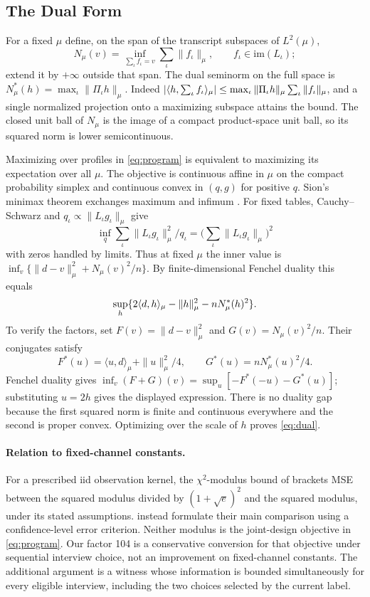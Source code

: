 \subsection{The Dual Form}
For a fixed $\mu$ define, on the span of the transcript subspaces of $L^2(\mu)$,
\[
 N_\mu(v)=\inf_{\sum_\iota f_\iota=v}\sum_\iota\|f_\iota\|_\mu,\qquad f_\iota\in\mathrm{im}(L_\iota);
\]
extend it by $+\infty$ outside that span. The dual seminorm on the full space is $N_\mu^*(h)=\max_\iota\|\Pi_\iota h\|_\mu$. Indeed $|\langle h,\sum_\iota f_\iota\rangle_\mu|\le\max_\iota\|\Pi_\iota h\|_\mu\sum_\iota\|f_\iota\|_\mu$, and a single normalized projection onto a maximizing subspace attains the bound. The closed unit ball of $N_\mu$ is the image of a compact product-space unit ball, so its squared norm is lower semicontinuous.

Maximizing over profiles in \eqref{eq:program} is equivalent to maximizing its expectation over all $\mu$. The objective is continuous affine in $\mu$ on the compact probability simplex and continuous convex in $(q,g)$ for positive $q$. Sion's minimax theorem exchanges maximum and infimum \citep{sion1958}. For fixed tables, Cauchy--Schwarz and $q_\iota\propto\|L_\iota g_\iota\|_\mu$ give
\[
 \inf_q \sum_\iota\|L_\iota g_\iota\|_\mu^2/q_\iota
      =\Big(\sum_\iota\|L_\iota g_\iota\|_\mu\Big)^2
\]
with zeros handled by limits. Thus at fixed $\mu$ the inner value is $\inf_v \{\|d-v\|_\mu^2+N_\mu(v)^2/n\}$. By finite-dimensional Fenchel duality this equals
\[
 \sup_h\{2\langle d,h\rangle_\mu-\|h\|_\mu^2-nN_\mu^*(h)^2\}.
\]
To verify the factors, set $F(v)=\|d-v\|_\mu^2$ and $G(v)=N_\mu(v)^2/n$. Their conjugates satisfy
\[
 F^*(u)=\langle u,d\rangle_\mu+\|u\|_\mu^2/4,
 \qquad G^*(u)=nN_\mu^*(u)^2/4.
\]
Fenchel duality gives $\inf_v(F+G)(v)=\sup_u[-F^*(-u)-G^*(u)]$; substituting $u=2h$ gives the displayed expression. There is no duality gap because the first squared norm is finite and continuous everywhere and the second is proper convex. Optimizing over the scale of $h$ proves \eqref{eq:dual}.

\paragraph{Relation to fixed-channel constants.}
For a prescribed iid observation kernel, the $\chi^2$-modulus bound of \citet{polyanskiy2026} brackets MSE between the squared modulus divided by $(1+\sqrt e)^2$ and the squared modulus, under its stated assumptions. \citet{juditsky2009} instead formulate their main comparison using a confidence-level error criterion. Neither modulus is the joint-design objective in \eqref{eq:program}. Our factor 104 is a conservative conversion for that objective under sequential interview choice, not an improvement on fixed-channel constants. The additional argument is a witness whose information is bounded simultaneously for every eligible interview, including the two choices selected by the current label.


